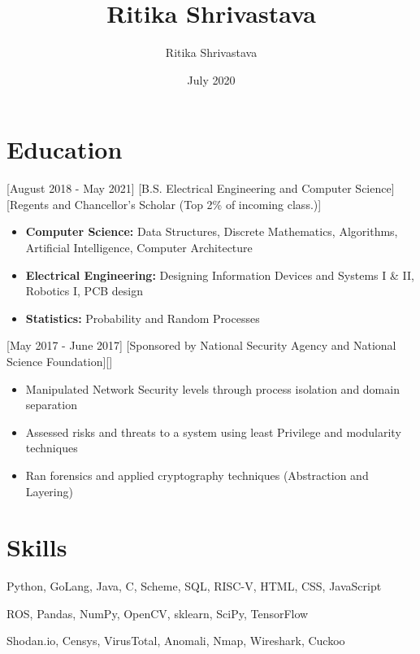 \documentclass{article}
\title{Ritika Shrivastava}
\author{Ritika Shrivastava}
\date{July 2020}
\begin{document}

\makecvtitle %

\section{Education}
 [August 2018 - May 2021]
[B.S. Electrical Engineering and Computer Science][Regents and Chancellor's Scholar (Top 2\% of incoming class.)]
\begin{itemize}
\item \textbf{Computer Science:} Data Structures, Discrete Mathematics, Algorithms, Artificial Intelligence, Computer Architecture
\item \textbf{Electrical Engineering:} Designing Information Devices and Systems I \& II, Robotics I, PCB design
\item \textbf{Statistics:} Probability and Random Processes
\end{itemize}

  [May 2017 - June 2017]
[Sponsored by National Security Agency and National Science Foundation][]
\begin{itemize}
\item Manipulated Network Security levels through process isolation and domain separation
\item Assessed risks and threats to a system using least Privilege and modularity techniques
\item Ran forensics and applied cryptography techniques (Abstraction and Layering)
\end{itemize}
 
\section{Skills}
\begin{description}[widest=Langauges]
\item[Languages] Python, GoLang, Java, C, Scheme, SQL, RISC-V, HTML, CSS, JavaScript
\item[Python Libraries] ROS, Pandas, NumPy, OpenCV, sklearn, SciPy, TensorFlow
\item[Security Tools \& APIs] Shodan.io, Censys, VirusTotal, Anomali, Nmap, Wireshark, Cuckoo 
\end{description}
\end{document}
